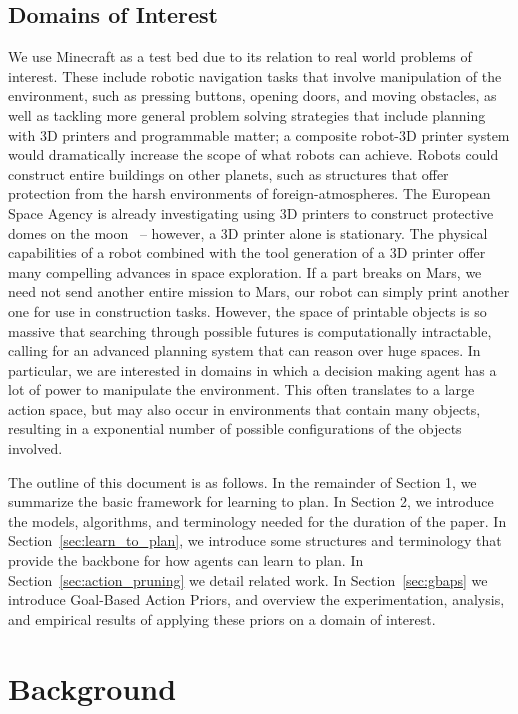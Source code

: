 \documentclass[11pt]{article}
\begin{document}
\subsection{Domains of Interest}
We use Minecraft as a test bed due to its relation to real world problems of interest. These include robotic navigation tasks that involve manipulation of the environment, such as pressing buttons, opening doors, and moving obstacles, as well as tackling more general problem solving strategies that include planning with 3D printers and programmable matter; a composite robot-3D printer system would dramatically increase the scope of what robots can achieve. Robots could construct entire buildings on other planets, such as structures that offer protection from the harsh environments of foreign-atmospheres. The European Space Agency is already investigating using 3D printers to construct protective domes on the moon~\cite{ceccanti20103D,Cesaretti2014430} -- however, a 3D printer alone is stationary. The physical capabilities of a robot combined with the tool generation of a 3D printer offer many compelling advances in space exploration. If a part breaks on Mars, we need not send another entire mission to Mars, our robot can simply print another one for use in construction tasks. However, the space of printable objects is so massive that searching through possible futures is computationally intractable, calling for an advanced planning system that can reason over huge spaces. In particular, we are interested in domains in which a decision making agent has a lot of power to manipulate the environment. This often translates to a large action space, but may also occur in environments that contain many objects, resulting in a exponential number of possible configurations of the objects involved.

The outline of this document is as follows. In the remainder of Section 1, we summarize the basic framework for learning to plan. In Section 2, we introduce the models, algorithms, and terminology needed for the duration of the paper. In Section~\ref{sec:learn_to_plan}, we introduce some structures and terminology that provide the backbone for how agents can learn to plan. In Section~\ref{sec:action_pruning} we detail related work. In Section~\ref{sec:gbaps} we introduce Goal-Based Action Priors, and overview the experimentation, analysis, and empirical results of applying these priors on a domain of interest.


\section{Background}
\label{sec:background}
\end{document}
